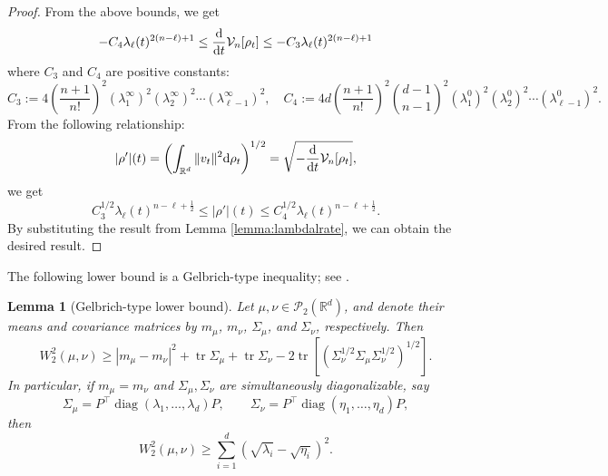 \documentclass[11pt,reqno]{amsart}
\numberwithin{figure}{section}
\def\d {{\partial}}
\newcommand{\bbr}{\mathbb R}
\def\d{\mathrm{d}}
\newcommand{\dm}{d}
\renewcommand{\d}{  {\textup{d}} }
\newtheorem{lemma}{Lemma}[section]
\begin{document}
\begin{proof}
From the above bounds, we get
\[
 -C_4\lambda_{\ell}(t)^{2(n-\ell)+1}\leq \frac{\d}{\d t}\mathcal{V}_n[\rho_t]\leq -C_3\lambda_{\ell}(t)^{2(n-\ell)+1}
\]
where $C_3$ and $C_4$ are positive constants:
\[
C_3:=4\left(\frac{n+1}{n!}\right)^2(\lambda_1^\infty)^2(\lambda_2^\infty)^2\cdots(\lambda_{\ell-1}^\infty)^2,\quad C_4:=4\dm\left(\frac{n+1}{n!}\right)^2{\dm-1\choose n-1}^2(\lambda_1^0)^2(\lambda_2^0)^2\cdots(\lambda_{\ell-1}^0)^2.
\]
From the following relationship:
\[
|\rho'|(t)=\left(\int_{\bbr^\dm}\|v_t\|^2\d\rho_t\right)^{1/2}=\sqrt{-\frac{\d}{\d t}\mathcal{V}_n[\rho_t]},
\]
we get
\[
C_3^{1/2}\lambda_{\ell}(t)^{n-\ell+\frac{1}{2}}\leq| \rho'|(t)\leq C_4^{1/2}\lambda_{\ell}(t)^{n-\ell+\frac{1}{2}}.
\]
By substituting the result from  Lemma \ref{lemma:lambdalrate}, we can obtain the desired result.
\end{proof}

The following lower bound is a Gelbrich-type inequality; see \cite{gelbrich1990formula}.

\begin{lemma}[Gelbrich-type lower bound]\label{lem:Gelbrich-lower-bound}
Let $\mu,\nu\in\mathcal P_2(\mathbb R^d)$, and denote their means and
covariance matrices by $m_\mu$, $m_\nu$, $\Sigma_\mu$, and $\Sigma_\nu$, respectively. Then
\[
W_2^2(\mu,\nu)
\geq |m_\mu-m_\nu|^2
+
\operatorname{tr}\Sigma_\mu
+
\operatorname{tr}\Sigma_\nu 
-
2\operatorname{tr}
\left[
\left(
\Sigma_\nu^{1/2}\Sigma_\mu\Sigma_\nu^{1/2}
\right)^{1/2}
\right].
\]
In particular, if $m_\mu=m_\nu$ and $\Sigma_\mu,\Sigma_\nu$ are simultaneously
diagonalizable, say
\[
\Sigma_\mu=P^\top\operatorname{diag}(\lambda_1,\dots,\lambda_d)P,
\qquad
\Sigma_\nu=P^\top\operatorname{diag}(\eta_1,\dots,\eta_d)P,
\]
then
\[
W_2^2(\mu,\nu)
\ge
\sum_{i=1}^d
\left(\sqrt{\lambda_i}-\sqrt{\eta_i}\right)^2.
\]
\end{lemma}
\end{document}
